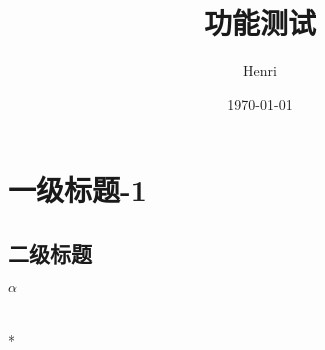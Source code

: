 \documentclass[11pt]{article}
\author{Henri}
\date{\today}
\title{功能测试}
\begin{document}
\maketitle
\tableofcontents


\section{}
\label{sec:org8b481a4}

\section{一级标题-1}
\label{sec:orgaa4b31e}
\subsection{二级标题}
\label{sec:orgab6e263}
\(\alpha\)

\section{}
\label{sec:orga246878}

*
\end{document}
